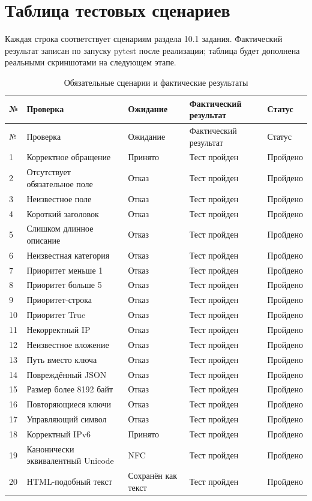 \documentclass[12pt,a4paper]{article}
\begin{document}
\section{Таблица тестовых сценариев}
Каждая строка соответствует сценариям раздела 10.1 задания. Фактический результат записан по запуску pytest после реализации; таблица будет дополнена реальными скриншотами на следующем этапе.
\small
\begin{longtable}{p{0.7cm}p{6.3cm}p{2.4cm}p{3cm}p{1.9cm}}
\caption{Обязательные сценарии и фактические результаты}\\
\toprule № & Проверка & Ожидание & Фактический результат & Статус\\\midrule\endfirsthead
\toprule № & Проверка & Ожидание & Фактический результат & Статус\\\midrule\endhead
1 & Корректное обращение & Принято & Тест пройден & Пройдено\\
2 & Отсутствует обязательное поле & Отказ & Тест пройден & Пройдено\\
3 & Неизвестное поле & Отказ & Тест пройден & Пройдено\\
4 & Короткий заголовок & Отказ & Тест пройден & Пройдено\\
5 & Слишком длинное описание & Отказ & Тест пройден & Пройдено\\
6 & Неизвестная категория & Отказ & Тест пройден & Пройдено\\
7 & Приоритет меньше 1 & Отказ & Тест пройден & Пройдено\\
8 & Приоритет больше 5 & Отказ & Тест пройден & Пройдено\\
9 & Приоритет-строка & Отказ & Тест пройден & Пройдено\\
10 & Приоритет True & Отказ & Тест пройден & Пройдено\\
11 & Некорректный IP & Отказ & Тест пройден & Пройдено\\
12 & Неизвестное вложение & Отказ & Тест пройден & Пройдено\\
13 & Путь вместо ключа & Отказ & Тест пройден & Пройдено\\
14 & Повреждённый JSON & Отказ & Тест пройден & Пройдено\\
15 & Размер более 8192 байт & Отказ & Тест пройден & Пройдено\\
16 & Повторяющиеся ключи & Отказ & Тест пройден & Пройдено\\
17 & Управляющий символ & Отказ & Тест пройден & Пройдено\\
18 & Корректный IPv6 & Принято & Тест пройден & Пройдено\\
19 & Канонически эквивалентный Unicode & NFC & Тест пройден & Пройдено\\
20 & HTML-подобный текст & Сохранён как текст & Тест пройден & Пройдено\\
\bottomrule
\end{longtable}
\normalsize
\end{document}
